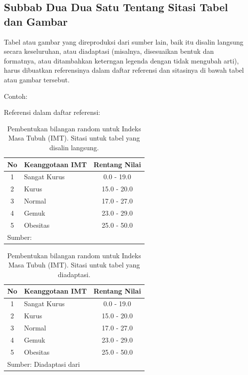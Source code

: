 \subsection{Subbab Dua Dua Satu Tentang Sitasi Tabel dan Gambar}

Tabel atau gambar yang direproduksi dari sumber lain, baik itu disalin langsung secara keseluruhan, atau diadaptasi (misalnya, disesuaikan bentuk dan formatnya, atau ditambahkan keterngan legenda dengan tidak mengubah arti), harus dibuatkan referensinya dalam daftar referensi dan sitasinya di bawah tabel atau gambar tersebut.

Contoh:

Referensi dalam daftar referensi:

\begin{displayquote}
\end{displayquote}

\begin{table}
  \centering
  \renewcommand{\arraystretch}{1.2}
  \caption{Pembentukan bilangan random untuk Indeks Masa Tubuh (IMT). Sitasi untuk tabel yang disalin langsung.}
  \begin{tabular}{clc}
    \hline
    No & Keanggotaan IMT & Rentang Nilai \\
    \hline
    1 & Sangat Kurus & 0.0 - 19.0 \\
    2 & Kurus & 15.0 - 20.0 \\
    3 & Normal & 17.0 - 27.0 \\
    4 & Gemuk & 23.0 - 29.0 \\
    5 & Obesitas & 25.0 - 50.0 \\
    \hline
    \multicolumn{2}{l}{\footnotesize{Sumber: \cite{anggariawan:2014}}} \\
  \end{tabular}
\end{table}




\begin{table}
  \centering
  \renewcommand{\arraystretch}{1.2}
  \caption{Pembentukan bilangan random untuk Indeks Masa Tubuh (IMT). Sitasi untuk tabel yang diadaptasi.}
  \begin{tabular}{clc}
    \hline
    No & Keanggotaan IMT & Rentang Nilai \\
    \hline
    1 & Sangat Kurus & 0.0 - 19.0 \\
    2 & Kurus & 15.0 - 20.0 \\
    3 & Normal & 17.0 - 27.0 \\
    4 & Gemuk & 23.0 - 29.0 \\
    5 & Obesitas & 25.0 - 50.0 \\
    \hline
    \multicolumn{2}{l}{\footnotesize{Sumber: Diadaptasi dari \cite{anggariawan:2014}}} \\
  \end{tabular}
\end{table}

